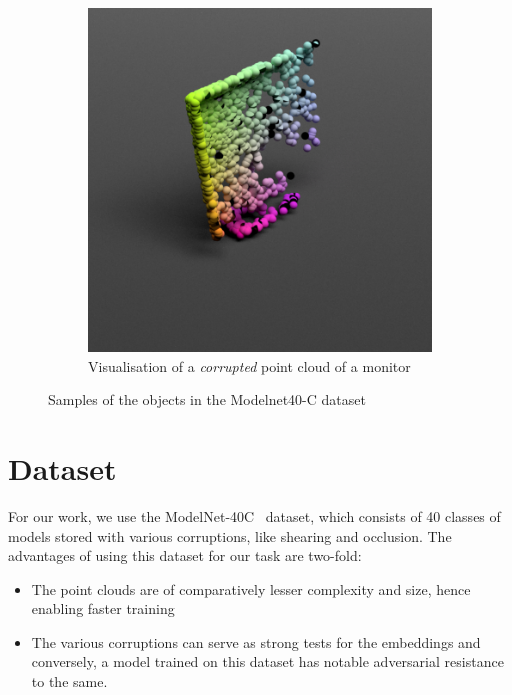 \documentclass[letterpaper, 10 pt, conference]{ieeeconf}  %
\begin{document}
\begin{figure}
\begin{subfigure}{0.20\textwidth}
    \includegraphics[width=\textwidth]{modelnet_40_corrupted_sample.png}
    \caption{Visualisation of a \textit{corrupted} point cloud of a monitor}
    \label{modelnetc:corrupted}
\end{subfigure}
\hfill        
\caption{Samples of the objects in the Modelnet40-C dataset}
\label{modelnetc:samples}
\end{figure}




\section{Dataset}
\label{dataset}
For our work, we use the ModelNet-40C~\cite{sun2022benchmarking} dataset, which consists of 40 classes of models stored with various corruptions, like shearing and occlusion. The advantages of using this dataset for our task are two-fold: 
\begin{itemize}
    \item The point clouds are of comparatively lesser complexity and size, hence enabling faster training
    \item The various corruptions can serve as strong tests for the embeddings and conversely, a model trained on this dataset has notable adversarial resistance to the same.
\end{itemize}
\end{document}
